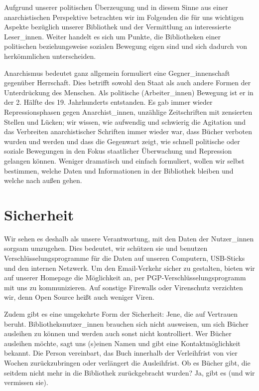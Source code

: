 \documentclass[a4paper,
fontsize=11pt,
oneside,
numbers=noperiodatend,
parskip=half-,
bibliography=totoc,
final
]{scrartcl}
\begin{document}
Aufgrund unserer politischen Überzeugung und in diesem Sinne aus einer
anarchistischen Perspektive betrachten wir im Folgenden die für uns
wichtigen Aspekte bezüglich unserer Bibliothek und der Vermittlung an
interessierte Leser\_innen. Weiter handelt es sich um Punkte, die
Bibliotheken einer politischen beziehungsweise sozialen Bewegung eigen
sind und sich dadurch von herkömmlichen unterscheiden.

Anarchismus bedeutet ganz allgemein formuliert eine Gegner\_innenschaft
gegenüber Herrschaft. Dies betrifft sowohl den Staat als auch andere
Formen der Unterdrückung des Menschen. Als politische (Arbeiter\_innen)
Bewegung ist er in der 2. Hälfte des 19. Jahrhunderts entstanden. Es gab
immer wieder Repressionsphasen gegen Anarchist\_innen, unzählige
Zeitschriften mit zensierten Stellen und Lücken; wir wissen, wie
aufwendig und schwierig die Agitation und das Verbreiten anarchistischer
Schriften immer wieder war, dass Bücher verboten wurden und werden und
dass die Gegenwart zeigt, wie schnell politische oder soziale Bewegungen
in den Fokus staatlicher Überwachung und Repression gelangen können.
Weniger dramatisch und einfach formuliert, wollen wir selbst bestimmen,
welche Daten und Informationen in der Bibliothek bleiben und welche nach
außen gehen.

\section*{Sicherheit}\label{sicherheit}

Wir sehen es deshalb als unsere Verantwortung, mit den Daten der
Nutzer\_innen sorgsam umzugehen. Dies bedeutet, wir schützen sie und
benutzen Verschlüsselungsprogramme für die Daten auf unseren Computern,
USB-Sticks und den internen Netzwerk. Um den Email-Verkehr sicher zu
gestalten, bieten wir auf unserer Homepage die Möglichkeit an, per
PGP-Verschlüsselungsprogramm mit uns zu kommunizieren. Auf sonstige
Firewalls oder Virenschutz verzichten wir, denn Open Source heißt auch
weniger Viren.

Zudem gibt es eine umgekehrte Form der Sicherheit: Jene, die auf
Vertrauen beruht. Bibliotheksnutzer\_innen brauchen sich nicht
ausweisen, um sich Bücher ausleihen zu können und werden auch sonst
nicht kontrolliert. Wer Bücher ausleihen möchte, sagt uns (s)einen Namen
und gibt eine Kontaktmöglichkeit bekannt. Die Person vereinbart, das
Buch innerhalb der Verleihfrist von vier Wochen zurückzubringen oder
verlängert die Ausleihfrist. Ob es Bücher gibt, die seitdem nicht mehr
in die Bibliothek zurückgebracht wurden? Ja, gibt es (und wir vermissen
sie).
\end{document}

